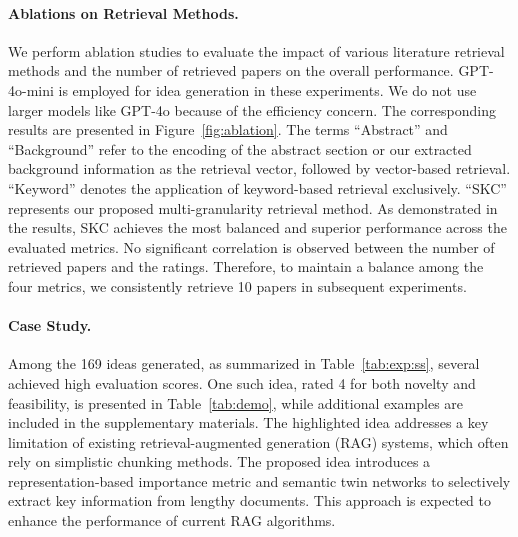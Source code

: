 \documentclass{article}
\theoremstyle{plain}
\theoremstyle{definition}
\theoremstyle{remark}
\begin{document}
\paragraph{Ablations on Retrieval Methods.} We perform ablation studies to evaluate the impact of various literature retrieval methods and the number of retrieved papers on the overall performance. GPT-4o-mini is employed for idea generation in these experiments. We do not use larger models like GPT-4o because of the efficiency concern. The corresponding results are presented in Figure~\ref{fig:ablation}. The terms ``Abstract'' and ``Background'' refer to the encoding of the abstract section or our extracted background information as the retrieval vector, followed by vector-based retrieval. ``Keyword'' denotes the application of keyword-based retrieval exclusively. ``SKC'' represents our proposed multi-granularity retrieval method. As demonstrated in the results, SKC achieves the most balanced and superior performance across the evaluated metrics. No significant correlation is observed between the number of retrieved papers and the ratings. Therefore, to maintain a balance among the four metrics, we consistently retrieve 10 papers in subsequent experiments.
\vspace{-5mm}
\paragraph{Case Study.} Among the 169 ideas generated, as summarized in Table~\ref{tab:exp:ss}, several achieved high evaluation scores. One such idea, rated 4 for both novelty and feasibility, is presented in Table~\ref{tab:demo}, while additional examples are included in the supplementary materials. The highlighted idea addresses a key limitation of existing retrieval-augmented generation (RAG) systems, which often rely on simplistic chunking methods. The proposed idea introduces a representation-based importance metric and semantic twin networks to selectively extract key information from lengthy documents. This approach is expected to enhance the performance of current RAG algorithms.
\vspace{-2mm}
\end{document}
